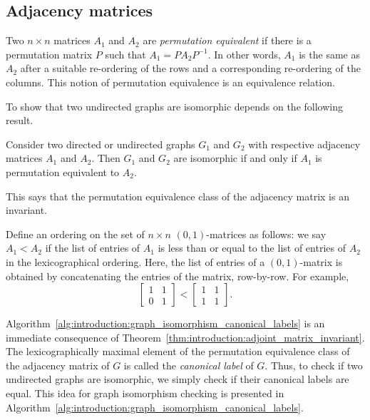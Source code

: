 
\subsection{Adjacency matrices}

Two $n \times n$ matrices $A_1$ and $A_2$ are
\emph{permutation equivalent} if there is a permutation matrix $P$
such that $A_1 = P A_2 P^{-1}$. In other words, $A_1$ is the same as
$A_2$ after a suitable re-ordering of the rows and a corresponding
re-ordering of the columns. This notion of permutation equivalence is
an equivalence relation.

To show that two undirected graphs are isomorphic depends on the
following result.

\begin{theorem}
\label{thm:introduction:adjoint_matrix_invariant}
Consider two directed or undirected graphs $G_1$ and $G_2$ with
respective adjacency matrices $A_1$ and $A_2$. Then $G_1$ and $G_2$
are isomorphic if and only if $A_1$ is permutation equivalent to
$A_2$.
\end{theorem}

This says that the permutation equivalence class of the adjacency
matrix is an invariant.

Define an ordering on the set of $n \times n$ $(0, 1)$-matrices as
follows: we say $A_1 < A_2$ if the list of entries of $A_1$ is less
than or equal to the list of entries of $A_2$ in the lexicographical
ordering. Here, the list of entries of a $(0, 1)$-matrix is obtained
by concatenating the entries of the matrix, row-by-row. For example,
\[
\begin{bmatrix}
1 & 1 \\
0 & 1
\end{bmatrix}
<
\begin{bmatrix}
1 & 1 \\
1 & 1
\end{bmatrix}.
\]

Algorithm~\ref{alg:introduction:graph_isomorphism_canonical_labels} is
an immediate consequence of
Theorem~\ref{thm:introduction:adjoint_matrix_invariant}. The
lexicographically maximal element of the permutation equivalence class
of the adjacency matrix of $G$ is called the \emph{canonical label} of
$G$. Thus, to check if two undirected graphs are isomorphic, we simply
check if their canonical labels are equal. This idea for graph
isomorphism checking is presented in
Algorithm~\ref{alg:introduction:graph_isomorphism_canonical_labels}.

